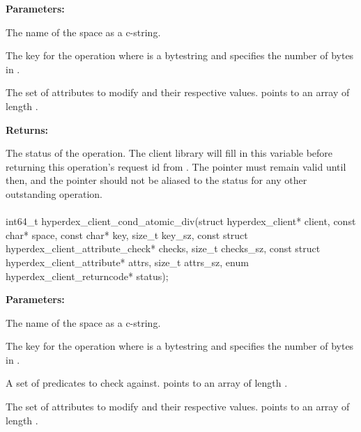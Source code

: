 \noindent\textbf{Parameters:}
\begin{description}[labelindent=\widthof{{\code{attrs}, \code{attrs\_sz}}},leftmargin=*,noitemsep,nolistsep,align=right]
\item[\code{space}] The name of the space as a c-string.
\item[\code{key}, \code{key\_sz}] The key for the operation where  is a bytestring and  specifies the number of bytes in .
\item[\code{attrs}, \code{attrs\_sz}] The set of attributes to modify and their respective values.   points to an array of length .
\end{description}

\noindent\textbf{Returns:}
\begin{description}[labelindent=\widthof{{\code{status}}},leftmargin=*,noitemsep,nolistsep,align=right]
\item[\code{status}] The status of the operation.  The client library will fill in this variable before returning this operation's request id from .  The pointer must remain valid until then, and the pointer should not be aliased to the status for any other outstanding operation.
\end{description}

\paragraph{}
\begin{ccode}
int64_t hyperdex_client_cond_atomic_div(struct hyperdex_client* client,
                const char* space,
                const char* key, size_t key_sz,
                const struct hyperdex_client_attribute_check* checks, size_t checks_sz,
                const struct hyperdex_client_attribute* attrs, size_t attrs_sz,
                enum hyperdex_client_returncode* status);
\end{ccode}
\funcdesc 

\noindent\textbf{Parameters:}
\begin{description}[labelindent=\widthof{{\code{checks}, \code{checks\_sz}}},leftmargin=*,noitemsep,nolistsep,align=right]
\item[\code{space}] The name of the space as a c-string.
\item[\code{key}, \code{key\_sz}] The key for the operation where  is a bytestring and  specifies the number of bytes in .
\item[\code{checks}, \code{checks\_sz}] A set of predicates to check against.   points to an array of length .
\item[\code{attrs}, \code{attrs\_sz}] The set of attributes to modify and their respective values.   points to an array of length .
\end{description}

